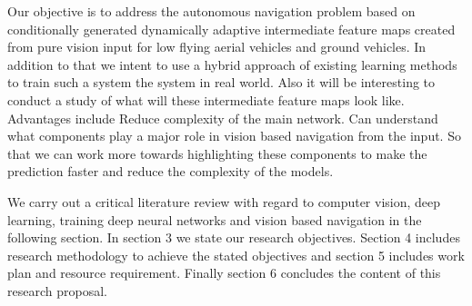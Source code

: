 Our objective is to address the autonomous navigation problem based on conditionally generated dynamically adaptive intermediate feature maps created from pure vision input for low flying aerial vehicles and ground vehicles. In addition to that we intent to use a hybrid approach of existing learning methods to train such a system the system in real world. Also it will be interesting to conduct a study of what will these intermediate feature maps look like. Advantages include Reduce complexity of the main network. Can understand what components play a major role in vision based navigation from the input. So that we can work more towards highlighting these components to make the prediction faster and reduce the complexity of the models. 

We carry out a critical literature review with regard to computer vision, deep learning, training deep neural networks and vision based navigation in the following section. In section 3 we state our research objectives. Section 4 includes research methodology to achieve the stated objectives and section 5 includes work plan and resource requirement. Finally section 6 concludes the content of this research proposal.  
